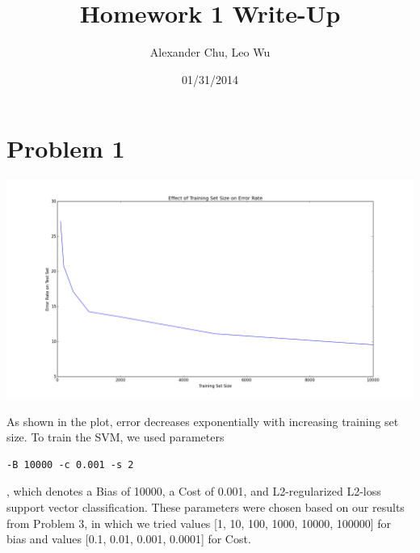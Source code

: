 \documentclass[10pt]{article}
\title{Homework 1 Write-Up}
\date{01/31/2014}
\author{Alexander Chu, Leo Wu}
\begin{document}
\maketitle
\section{Problem 1}
\begin{center}
\includegraphics[scale=.5]{./errorPlot.png}
\end{center}
As shown in the plot, error decreases exponentially with increasing training set size.
To train the SVM, we used parameters \begin{verbatim}-B 10000 -c 0.001 -s 2\end{verbatim}, which denotes a Bias of 10000, a Cost of 0.001, and L2-regularized L2-loss support vector classification. These parameters were chosen based on our results from Problem 3, in which we tried values [1, 10, 100, 1000, 10000, 100000] for bias and values [0.1, 0.01, 0.001, 0.0001] for Cost.
\end{document}
